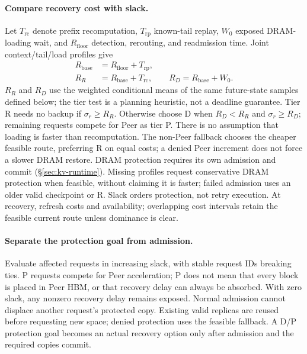 \paragraph{Compare recovery cost with slack.}
Let $T_{\mathrm{rc}}$ denote prefix recomputation, $T_{\mathrm{rp}}$ known-tail
replay, $W_0$ exposed DRAM-loading wait, and $R_{\mathrm{floor}}$ detection,
rerouting, and readmission time. Joint context/tail/load profiles give
\begin{equation}
\begin{aligned}
 R_{\mathrm{base}}&=R_{\mathrm{floor}}+T_{\mathrm{rp}},\\
 R_R&=R_{\mathrm{base}}+T_{\mathrm{rc}},\qquad
 R_D=R_{\mathrm{base}}+W_0.
\end{aligned}
\label{eq:recovery-base}
\end{equation}
$R_R$ and $R_D$ use the weighted conditional means of the same
future-state samples defined below; the tier test is a planning heuristic,
not a deadline guarantee. Tier R needs no backup if $\sigma_r\ge R_R$.
Otherwise choose D when $R_D<R_R$ and $\sigma_r\ge R_D$; remaining
requests compete for Peer as tier P. There is no assumption that loading
is faster than recomputation. The non-Peer fallback chooses the cheaper
feasible route, preferring R on equal costs; a denied Peer increment does
not force a slower DRAM restore. DRAM protection requires its own admission
and commit (\S\ref{sec:kv-runtime}). Missing profiles request conservative
DRAM protection when feasible, without claiming it is faster; failed
admission uses an older valid checkpoint or R. Slack orders protection,
not retry execution. At recovery, refresh costs and availability; overlapping
cost intervals retain the feasible current route unless dominance is clear.

\paragraph{Separate the protection goal from admission.}
Evaluate affected requests in increasing slack, with stable request IDs
breaking ties. P requests compete for Peer acceleration; P does not mean
that every block is placed in Peer HBM, or that recovery delay can always
be absorbed. With zero slack, any nonzero recovery delay remains exposed.
Normal admission cannot displace another request's protected copy.
Existing valid replicas are reused before requesting new space; denied
protection uses the feasible fallback. A D/P protection goal becomes an
actual recovery option only after admission and the required copies commit.

